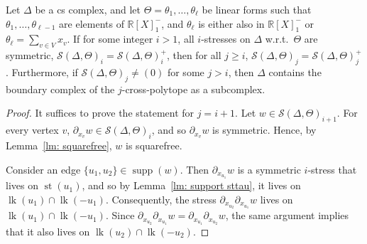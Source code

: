 \documentclass[ALCO,ThmDefs,Unicode,epreuves]{cedram}
\DeclareMathOperator{\lk}{lk}
\DeclareMathOperator{\st}{st}
\DeclareMathOperator{\supp}{supp}
\newcommand{\R}{\mathbb{R}{}}
\newcommand{\Stress}{\mathcal{S}}
\begin{document}
\begin{theorem}\label{main theorem prep}
	Let $\Delta$ be a cs complex, and let $\Theta=\theta_1,\ldots,\theta_\ell$ be linear forms such that $\theta_1,\ldots,\theta_{\ell-1}$ are elements of $\R[X]^-_1$, and $\theta_\ell$ is either also in $\R[X]^-_1$ or $\theta_\ell=\sum_{v\in V} x_v$. If for some integer $i>1$, all $i$-stresses on $\Delta$ w.r.t.~$\Theta$ are symmetric, \ie $\Stress(\Delta,\Theta)_i=\Stress(\Delta,\Theta)^+_i$, then for all $j\geq i$, $\Stress(\Delta,\Theta)_{j}=\Stress(\Delta,\Theta)^+_{j}$. Furthermore, if $\Stress(\Delta,\Theta)_{j}\neq (0)$ for some $j> i$, then $\Delta$ contains the boundary complex of the $j$-cross-polytope as a subcomplex.
\end{theorem}
\begin{proof}
	It suffices to prove the statement for $j=i+1$. Let $w\in \mathcal{S}(\Delta, \Theta)_{i+1}$. For every vertex $v$, $\partial_{x_v} w\in \mathcal{S}(\Delta, \Theta)_i$, and so $\partial_{x_v} w$ is symmetric. Hence, by Lemma~\ref{lm: squarefree}, $w$ is squarefree. 
	
	Consider an edge $\{u_1, u_2\}\in \supp(w)$. Then $\partial_{x_{u_1}} w$ is a symmetric $i$-stress that lives on $\st( u_1)$, and so by Lemma~\ref{lm: support sttau}, it lives on $\lk (u_1)\cap \lk (-u_1)$. Consequently, the stress $\partial_{x_{u_2}}\partial_{x_{u_1}} w$ lives on $\lk(u_1)\cap \lk(-u_1)$. Since $\partial_{x_{u_2}}\partial_{x_{u_1}} w=\partial_{x_{u_1}}\partial_{x_{u_2}} w$, the same argument implies that it also lives on $\lk(u_2)\cap \lk(-u_2)$. 
	

\end{proof}
\end{document}
